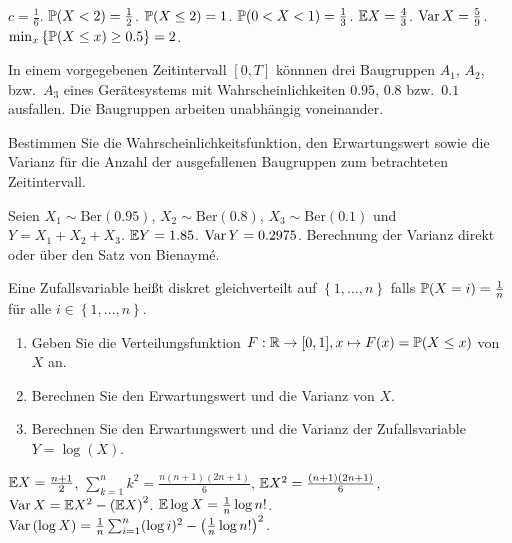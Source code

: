 \solution $c=\frac{1}{6}$. $\mathbb P(X<2)=\frac{1}{2}$. $\mathbb P(X\leq 2)=1$.
$\mathbb P(0<X<1)=\frac{1}{3}$. $\mathbb E X=\frac{4}{3}$. $\operatorname{Var} X = \frac{5}{9}$.
$\min_{x} \left\{ \mathbb P(X\leq x) \geq 0.5 \right\}=2$.


In einem vorgegebenen Zeitintervall $[0,T]$ könnnen drei Baugruppen $A_1$,
$A_2$, bzw.\ $A_3$ eines Gerätesystems mit Wahrscheinlichkeiten $0.95$, $0.8$
bzw.\ $0.1$ ausfallen. Die Baugruppen arbeiten unabhängig voneinander. 

Bestimmen Sie die Wahrscheinlichkeitsfunktion, den Erwartungswert sowie die
Varianz für die Anzahl der ausgefallenen Baugruppen zum betrachteten
Zeitintervall.

\solution
Seien $X_1 \sim \text{Ber}(0.95)$, $X_2 \sim \text{Ber}(0.8)$, $X_3 \sim
\text{Ber}(0.1)$ und $Y=X_1+X_2+X_3$. $\mathbb E Y = 1.85$. $\operatorname{Var} Y = 0.2975$.
Berechnung der Varianz direkt oder über den Satz von Bienaym\'e.


 Eine Zufallsvariable heißt
diskret gleichverteilt auf $\left\{ 1,\dots ,n \right\}$ falls
$\mathbb P(X=i)=\frac{1}{n}$ für alle $i\in\left\{ 1,\dots ,n \right\}$.
\begin{enumerate}
    \item Geben Sie die Verteilungsfunktion $F: \mathbb R\to [0,1], x\mapsto F(x) =
        \mathbb P(X \leq x)$ von $X$ an.

    \item Berechnen Sie den Erwartungswert und die Varianz von $X$. 

    \item Berechnen Sie den Erwartungswert und die Varianz der Zufallsvariable
        $Y = \log\left( X \right)$.

\end{enumerate}

\solution
$\mathbb E X = \frac{n+1}{2}$, $\sum_{k=1}^{n} k^2 = \frac{n(n+1)(2n+1)}{6}$,
$\mathbb E X^2 = \frac{(n+1)(2n+1)}{6}$, $\operatorname{Var} X = \mathbb E X^2 - \left( \mathbb E X \right)^2$.
$\mathbb E \log X = \frac{1}{n} \log n!$.
$\operatorname{Var} \left( \log X \right) = \frac{1}{n} \sum_{i=1}^{n} (\log i)^{2} - \left( \frac{1}{n} \log n! \right)^{2}$. 



